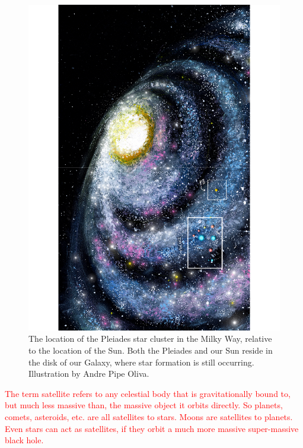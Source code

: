 \documentclass[main.tex]{subfiles}
\begin{document}
\begin{figure}
\includegraphics[width=\columnwidth,angle=270,origin=c]{ch1_5.pdf}
\caption{The location of the Pleiades star cluster in the Milky Way, relative to the location of the Sun.  Both the Pleiades and our Sun reside in the disk of our Galaxy, where star formation is still occurring.  Illustration by Andre Pipe Oliva.
\label{fig:fig5}}
\end{figure}


\begin{tcolorbox}[sharp corners, colback=red!30, colframe=red!80!blue, title=Satellites]
\par \textcolor{red} {The term satellite refers to any celestial body that is gravitationally bound to, but much less massive than, the massive object it orbits directly.  So planets, comets, asteroids, etc. are all satellites to stars.  Moons are satellites to planets.  Even stars can act as satellites, if they orbit a much more massive super-massive black hole.} 
\end{tcolorbox} 
\end{document}

